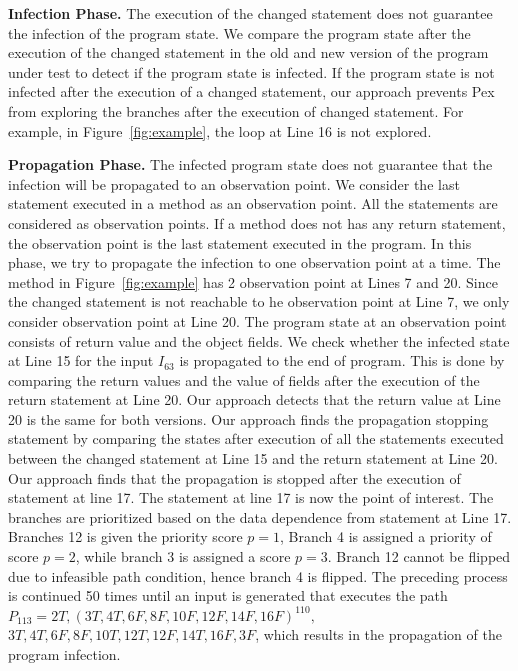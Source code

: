 {\textbf{Infection Phase. }  The execution of the changed statement does not guarantee the infection of the program state. We compare the program state after the execution of the changed statement in the old and new version of the program under test to detect if the program state is infected. If the program state is not infected after the execution of a changed statement, our approach prevents Pex from exploring the branches after the execution of changed statement. For example, in Figure~\ref{fig:example}, the loop at Line 16 is not explored. 

\textbf{Propagation Phase. } The infected program state does not guarantee that the infection will be propagated to an observation point. We consider the last statement executed in a method as an observation point. All the  statements are considered as observation points. If a method does not has any return statement, the observation point is the last statement executed in the program. In this phase, we try to propagate the infection to one observation point at a time.
The method  in Figure~\ref{fig:example} has 2 observation point at Lines 7 and 20. Since the changed statement is not reachable to he observation point at Line 7, we only consider observation point at Line 20. The program state at an observation point consists of return value and the object fields. We check whether the infected state at Line 15 for the input $I_{63}$ is propagated to the end of program. This is done by comparing the return values and the value of fields after the execution of the return statement at Line 20. Our approach detects that the return value at Line 20 is the same for both versions. Our approach finds the propagation stopping statement by comparing the states after execution of all the statements executed between the changed statement at Line 15 and the return statement at Line 20. Our approach finds that the propagation is stopped after the execution of statement at line 17. The statement at line 17 is now the point of interest. The branches are prioritized based on the data dependence from statement at Line 17. Branches 12 is given the priority score $p=1$, Branch 4 is assigned a priority of score $p=2$, while branch 3 is assigned a score $p=3$. Branch 12 cannot be flipped due to infeasible path condition, hence branch 4 is flipped. The preceding process is continued 50 times until an input is generated that executes the path $P_{113}= 2T, (3T, 4T, 6F, 8F, 10F, 12F, 14F, 16F)^{110},$ $3T, 4T, 6F, 8F, 10T, 12T, 12F, 14T, 16F, 3F$, which results in the propagation of the program infection.
}
